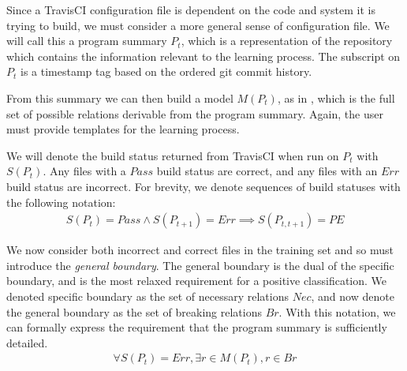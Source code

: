 Since a TravisCI configuration file is dependent
on the code and system it is trying to build, 
we must consider a more general sense of configuration file.
We will call this a program summary $P_t$, which is a representation 
of the repository which contains the information 
relevant to the learning process.
The subscript on $P_t$ is a timestamp tag based on 
the ordered git commit history.


From this summary we can then build a model $M(P_t)$, as in \app,
which is the full set of possible relations derivable 
from the program summary.
Again, the user must provide templates for the learning process.

We will denote the build status returned from TravisCI when run on $P_t$ with $S(P_t)$.
Any files with a $Pass$ build status are correct, and any files with an $Err$ build status are incorrect.
For brevity, we denote sequences of build statuses with the following notation:
\begin{align*}
  S(P_t)=Pass \land S(P_{t+1})=Err \implies S(P_{t,t+1}) = PE
\end{align*}

We now consider both incorrect and correct files in the training set 
and so must introduce the \textit{general boundary}.
The general boundary is the dual of the specific boundary, and is the most relaxed requirement for a positive classification.
We denoted specific boundary as the set of necessary relations $Nec$, and now denote the general boundary as the set of breaking relations $Br$.
With this notation, we can formally express the requirement that the program summary is sufficiently detailed.
\begin{align}
  \forall S(P_t)=Err, \exists r \in M(P_t), r \in Br \label{eq:E1}
\end{align}

